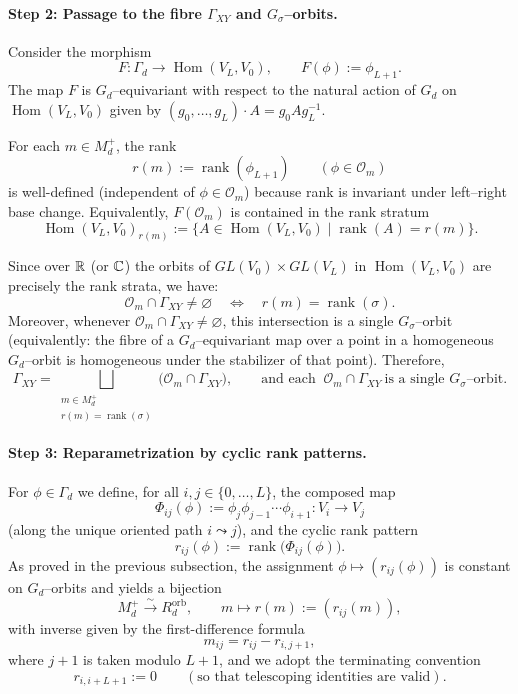 \documentclass{article}
\newcommand{\Hom}{\operatorname{Hom}}
\newcommand{\rank}{\operatorname{rank}}
\theoremstyle{definition}
\begin{document}
\paragraph{Step 2: Passage to the fibre $\Gamma_{XY}$ and $G_\sigma$--orbits.}
Consider the morphism
\[
F:\Gamma_d\longrightarrow \Hom(V_L,V_0),\qquad F(\phi):=\phi_{L+1}.
\]
The map $F$ is $G_d$--equivariant with respect to the natural action of $G_d$ on
$\Hom(V_L,V_0)$ given by $(g_0,\dots,g_L)\cdot A=g_0 A g_L^{-1}$.

For each $m\in M_d^+$, the rank
\[
r(m):=\rank(\phi_{L+1})
\qquad (\phi\in \mathcal O_m)
\]
is well-defined (independent of $\phi\in\mathcal O_m$) because rank is invariant under left--right
base change. Equivalently, $F(\mathcal O_m)$ is contained in the rank stratum
\[
\Hom(V_L,V_0)_{r(m)}:=\{A\in\Hom(V_L,V_0)\mid \rank(A)=r(m)\}.
\]

Since over $\Bbb R$ (or $\Bbb C$) the orbits of $GL(V_0)\times GL(V_L)$ in $\Hom(V_L,V_0)$
are precisely the rank strata, we have:
\begin{equation}\label{eq:nonempty_fibre_criterion}
\mathcal O_m\cap \Gamma_{XY}\neq\varnothing \quad\Longleftrightarrow\quad r(m)=\rank(\sigma).
\end{equation}
Moreover, whenever $\mathcal O_m\cap \Gamma_{XY}\neq\varnothing$, this intersection is a single
$G_\sigma$--orbit (equivalently: the fibre of a $G_d$--equivariant map over a point in a homogeneous
$G_d$--orbit is homogeneous under the stabilizer of that point). Therefore,
\begin{equation}\label{eq:Gamma_XY_orbit_decomp_m}
\Gamma_{XY}
=
\bigsqcup_{\substack{m\in M_d^+\\ r(m)=\rank(\sigma)}}
\bigl(\mathcal O_m\cap \Gamma_{XY}\bigr),
\qquad
\text{and each }\ \mathcal O_m\cap\Gamma_{XY}\ \text{is a single $G_\sigma$--orbit.}
\end{equation}

\paragraph{Step 3: Reparametrization by cyclic rank patterns.}
For $\phi\in\Gamma_d$ we define, for all $i,j\in\{0,\dots,L\}$, the composed map
\[
\Phi_{ij}(\phi):=\phi_{j}\phi_{j-1}\cdots \phi_{i+1}:V_i\to V_j
\]
(along the unique oriented path $i\leadsto j$), and the cyclic rank pattern
\[
r_{ij}(\phi):=\rank\bigl(\Phi_{ij}(\phi)\bigr).
\]
As proved in the previous subsection, the assignment $\phi\mapsto (r_{ij}(\phi))$
is constant on $G_d$--orbits and yields a bijection
\[
M_d^+ \xrightarrow{\ \sim\ } R_d^{\mathrm{orb}},
\qquad
m\longmapsto r(m):=(r_{ij}(m)),
\]
with inverse given by the first-difference formula
\begin{equation}\label{eq:m_from_r}
m_{ij}=r_{ij}-r_{i,j+1},
\end{equation}
where $j+1$ is taken modulo $L+1$, and we adopt the terminating convention
\[
r_{i,i+L+1}:=0
\qquad (\text{so that telescoping identities are valid}).
\]
\end{document}
